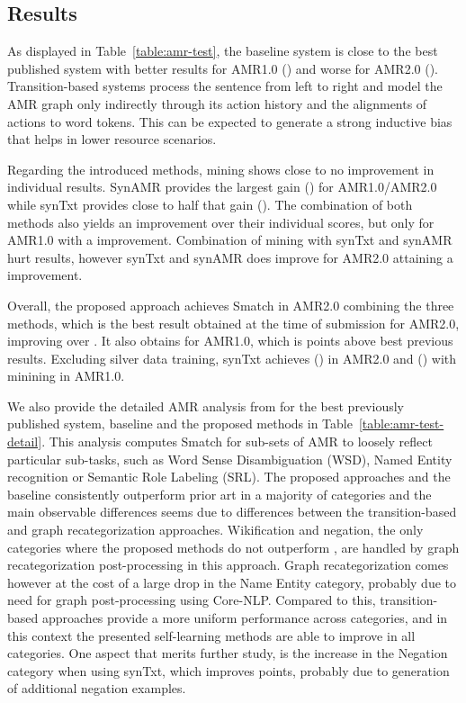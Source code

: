 \documentclass[11pt,a4paper]{article}
\begin{document}
\subsection{Results}

As displayed in Table~\ref{table:amr-test}, the baseline system is close to the best published system with better results for AMR1.0 () and worse for AMR2.0 (). Transition-based systems process the sentence from left to right and model the AMR graph only indirectly through its action history and the alignments of actions to word tokens. This can be expected to generate a strong inductive bias that helps in lower resource scenarios. 

Regarding the introduced methods, mining shows close to no improvement in individual results. SynAMR provides the largest gain () for AMR1.0/AMR2.0 while synTxt provides close to half that gain (). The combination of both methods also yields an improvement over their individual scores, but only for AMR1.0 with a  improvement. Combination of mining with synTxt and synAMR hurt results, however synTxt and synAMR does improve for AMR2.0 attaining a  improvement.

Overall, the proposed approach achieves  Smatch in AMR2.0 combining the three methods, which is the best result obtained at the time of submission for AMR2.0, improving  over \cite{cai2020amr}. It also obtains  for AMR1.0, which is  points above best previous results. Excluding silver data training, synTxt achieves  () in AMR2.0 and  () with minining in AMR1.0.

We also provide the detailed AMR analysis from \cite{damonte-etal-2017-incremental} for the best previously published system, baseline and the proposed methods in Table~\ref{table:amr-test-detail}. This analysis computes Smatch for sub-sets of AMR to loosely reflect particular sub-tasks, such as Word Sense Disambiguation (WSD), Named Entity recognition or Semantic Role Labeling (SRL). The proposed approaches and the baseline consistently outperform prior art in a majority of categories and the main observable differences seems due to differences between the transition-based and graph recategorization approaches. Wikification and negation, the only categories where the proposed methods do not outperform \cite{cai2020amr}, are handled by graph recategorization post-processing in this approach. Graph recategorization comes however at the cost of a large drop in the Name Entity category, probably due to need for graph post-processing using Core-NLP. Compared to this, transition-based approaches provide a more uniform performance across categories, and in this context the presented self-learning methods are able to improve in all categories. One aspect that merits further study, is the increase in the Negation category when using synTxt, which improves  points, probably due to generation of additional negation examples.
\end{document}
